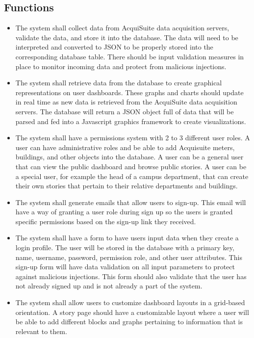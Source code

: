\documentclass[onecolumn, draftclsnofoot,10pt, compsoc]{IEEEtran}
\begin{document}
    
    \subsection{Functions}
    \begin{itemize}
    \item The system shall collect data from AcquiSuite data acquisition servers, validate the data, and store it into the database. The data will need to be interpreted and converted to JSON to be properly stored into the corresponding database table. There should be input validation measures in place to monitor incoming data and protect from malicious injections.
    \item The system shall retrieve data from the database to create graphical representations on user dashboards. These graphs and charts should update in real time as new data is retrieved from the AcquiSuite data acquisition servers. The database will return a JSON object full of data that will be parsed and fed into a Javascript graphics framework to create visualizations. 
    \item The system shall have a permissions system with 2 to 3 different user roles. A user can have administrative roles and be able to add Acquisuite meters, buildings, and other objects into the database. A user can be a general user that can view the public dashboard and browse public stories. A user can be a special user, for example the head of a campus department, that can create their own stories that pertain to their relative departments and buildings. 
    \item The system shall generate emails that allow users to sign-up. This email will have a way of granting a user role during sign up so the users is granted specific permissions based on the sign-up link they received. 
    \item The system shall have a form to have users input data when they create a login profile. The user will be stored in the database with a primary key, name, username, password, permission role, and other user attributes. This sign-up form will have data validation on all input parameters to protect against malicious injections. This form should also validate that the user has not already signed up and is not already a part of the system.
    \item The system shall allow users to customize dashboard layouts in a grid-based orientation. A story page should have a customizable layout where a user will be able to add different blocks and graphs pertaining to information that is relevant to them.

\end{itemize}
\end{document}

